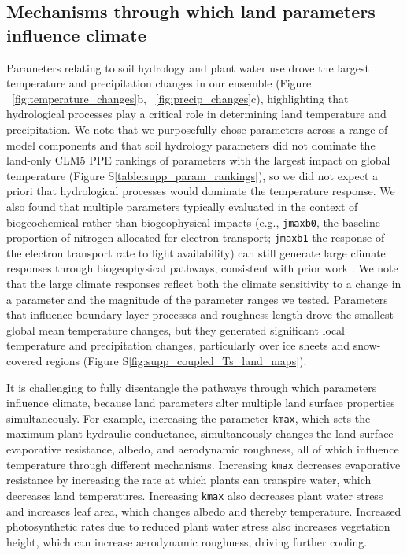 \documentclass[draft]{agujournal2019}
\begin{document}
\subsection{Mechanisms through which land parameters influence climate}
Parameters relating to soil hydrology and plant water use drove the largest temperature and precipitation changes in our ensemble (Figure ~\ref{fig:temperature_changes}b, ~\ref{fig:precip_changes}c), highlighting that hydrological processes play a critical role in determining land temperature and precipitation. We note that we purposefully chose parameters across a range of model components and that soil hydrology parameters did not dominate the land-only CLM5 PPE rankings of parameters with the largest impact on global temperature (Figure S\ref{table:supp_param_rankings}), so we did not expect a priori that hydrological processes would dominate the temperature response. We also found that multiple parameters typically evaluated in the context of biogeochemical rather than biogeophysical impacts (e.g., \texttt{jmaxb0}, the baseline proportion of nitrogen allocated for electron transport; \texttt{jmaxb1} the response of the electron transport rate to light availability) can still generate large climate responses through biogeophysical pathways, consistent with prior work \citep{smith_biophysical_2017}. We note that the large climate responses reflect both the climate sensitivity to a change in a parameter and the magnitude of the parameter ranges we tested. Parameters that influence boundary layer processes and roughness length drove the smallest global mean temperature changes, but they generated significant local temperature and precipitation changes, particularly over ice sheets and snow-covered regions (Figure S\ref{fig:supp_coupled_Ts_land_maps}).

It is challenging to fully disentangle the pathways through which parameters influence climate, because land parameters alter multiple land surface properties simultaneously. For example, increasing the parameter \texttt{kmax}, which sets the maximum plant hydraulic conductance, simultaneously changes the land surface evaporative resistance, albedo, and aerodynamic roughness, all of which influence temperature through different mechanisms. Increasing \texttt{kmax} decreases evaporative resistance by increasing the rate at which plants can transpire water, which decreases land temperatures. Increasing \texttt{kmax} also decreases plant water stress and increases leaf area, which changes albedo and thereby temperature. Increased photosynthetic rates due to reduced plant water stress also increases vegetation height, which can increase aerodynamic roughness, driving further cooling.
\end{document}
